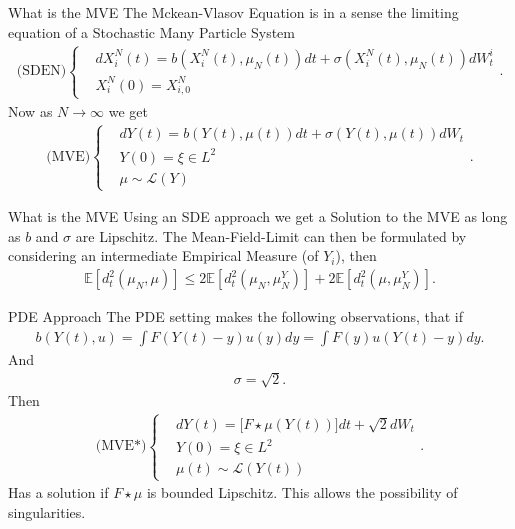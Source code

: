 \documentclass[10pt]{beamer}
\begin{document}
\begin{frame}{What is the MVE}
The Mckean-Vlasov Equation is in a sense the limiting equation of a Stochastic Many Particle System 
\begin{align*}
  \text{(SDEN)} \begin{cases}
    &d X_i^N(t) = b(X_i^{N}(t),\mu_N(t) ) dt + \sigma(X_i^{N}(t),\mu_N(t) )dW_t^i\\
    &X_i^N(0)  = X_{i,0}^{N} 
  \end{cases}
.\end{align*}
Now as $N\to \infty$ we get 
\begin{align*}
  \text{(MVE)} \begin{cases}
    &d Y(t) = b(Y(t),\mu(t) ) dt + \sigma(Y(t),\mu(t) )dW_t\\
    &Y(0)  = \xi \in  L^{2}  \\
    &\mu \sim \mathcal{L}(Y)
  \end{cases}
.\end{align*}
\end{frame}
\begin{frame}{What is the MVE}
  Using an SDE approach we get a Solution to the MVE  as long as $b$ and $\sigma $ are Lipschitz.
  The Mean-Field-Limit can then be formulated by considering an intermediate Empirical Measure (of $Y_i$), then 
  \begin{align*}
    \mathbb{E}[d_t^2(\mu_N,\mu )] \le  2 \mathbb{E}[d_t^2(\mu_N,\mu_N^{Y}  )] + 2 \mathbb{E}[d_t^2(\mu,\mu_N^{Y}  )]
  .\end{align*}
\end{frame}
\begin{frame}{PDE Approach}
The PDE setting makes the following observations, that if 
\begin{align*}
  b(Y(t),u) = \int F(Y(t)-y) u(y) dy = \int  F(y)u(Y(t)-y) dy
.\end{align*}
And 
\begin{align*}
  \sigma  = \sqrt{2} 
.\end{align*}
Then 
\begin{align*}
\text{(MVE*)} \begin{cases}
  &d Y(t) =  \bigg[F \star  \mu (Y(t)) \bigg]dt + \sqrt{2} dW_t\\
  &Y(0)  = \xi \in  L^{2}  \\
  &\mu(t) \sim \mathcal{L}(Y(t))
\end{cases}
.\end{align*}
Has a solution if $F \star  \mu $ is bounded Lipschitz. This allows the possibility of singularities.
\end{frame}
\end{document}
